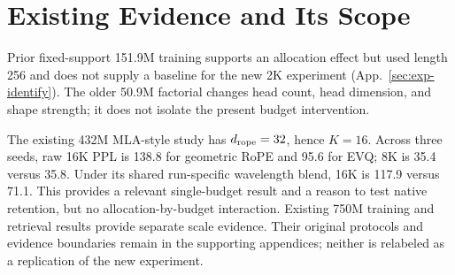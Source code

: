 \section{Existing Evidence and Its Scope}
\label{sec:budget-external}

Prior fixed-support 151.9M training supports an allocation effect but used
length 256 and does not supply a baseline for the new 2K experiment
(App.~\ref{sec:exp-identify}). The older 50.9M factorial changes head count,
head dimension, and shape strength; it does not isolate the present budget
intervention.

The existing 432M MLA-style study has $d_{\rm rope}=32$, hence $K=16$.
Across three seeds, raw 16K PPL is 138.8 for geometric RoPE and 95.6 for EVQ;
8K is 35.4 versus 35.8. Under its shared run-specific wavelength blend, 16K
is 117.9 versus 71.1. This provides a relevant single-budget result and a
reason to test native retention, but no allocation-by-budget interaction.
Existing 750M training and retrieval results provide separate scale evidence.
Their original protocols and evidence boundaries remain in the supporting
appendices; neither is relabeled as a replication of the new experiment.
